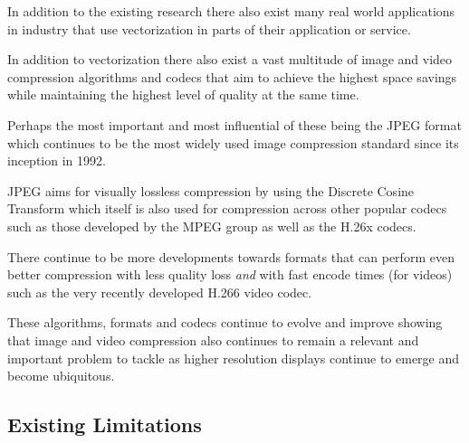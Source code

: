 \documentclass[12pt]{article}
\newcommand{\sentence}{} %
\newcommand{\italic}[1]{\textit{#1}}
\begin{document}
    \tab
    In addition to the existing research there also exist many real world applications in industry that
    use vectorization in parts of their application or service.
    \sentence

    \bigskip
    In addition to vectorization there also exist a vast multitude of image and video compression algorithms and
    codecs that aim to achieve the highest space savings while maintaining the highest level of quality at the same
    time.
    \sentence
    Perhaps the most important and most influential of these being the JPEG format which continues to be the most
    widely used image compression standard since its inception in 1992.
    \sentence
    JPEG aims for visually lossless compression by using the Discrete Cosine Transform which itself is also used for
    compression across other popular codecs such as those developed by the MPEG group as well as the H.26x codecs.
    \sentence
    There continue to be more developments towards formats that can perform even better compression with less quality
    loss \italic{and} with fast encode times (for videos) such as the very recently developed H.266 video codec.
    \sentence
    These algorithms, formats and codecs continue to evolve and improve showing that image and video compression also
    continues to remain a relevant and important problem to tackle as higher resolution displays continue to emerge
    and become ubiquitous.

    \subsection{Existing Limitations}\label{subsec:existing-limitations}
\end{document}
